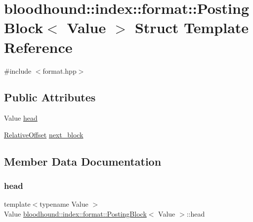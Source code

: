 \hypertarget{structbloodhound_1_1index_1_1format_1_1PostingBlock}{}\section{bloodhound\+:\+:index\+:\+:format\+:\+:Posting\+Block$<$ Value $>$ Struct Template Reference}
\label{structbloodhound_1_1index_1_1format_1_1PostingBlock}


{\ttfamily \#include $<$format.\+hpp$>$}

\subsection*{Public Attributes}
\begin{DoxyCompactItemize}
\item 
Value \mbox{\hyperlink{structbloodhound_1_1index_1_1format_1_1PostingBlock_a0820d9474f2563bf913457e3b8681370}{head}}
\item 
\mbox{\hyperlink{structbloodhound_1_1RelativeOffset}{Relative\+Offset}} \mbox{\hyperlink{structbloodhound_1_1index_1_1format_1_1PostingBlock_ad7e7da1b1f4ed16a0b51ba9c8fbac401}{next\+\_\+block}}
\end{DoxyCompactItemize}


\subsection{Member Data Documentation}
\mbox{\label{structbloodhound_1_1index_1_1format_1_1PostingBlock_a0820d9474f2563bf913457e3b8681370}} 
\subsubsection{\texorpdfstring{head}{head}}
{\footnotesize\ttfamily template$<$typename Value $>$ \\
Value \mbox{\hyperlink{structbloodhound_1_1index_1_1format_1_1PostingBlock}{bloodhound\+::index\+::format\+::\+Posting\+Block}}$<$ Value $>$\+::head}

\mbox{\label{structbloodhound_1_1index_1_1format_1_1PostingBlock_ad7e7da1b1f4ed16a0b51ba9c8fbac401}} 

